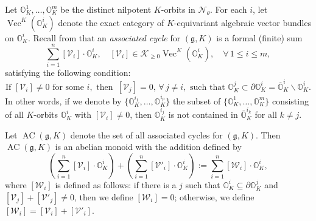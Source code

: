 \documentclass[11pt, a4paper]{amsart}
\newcommand{\g}{\mathfrak{g}}
\newcommand{\orb}{\mathbb{O}}
\newcommand{\orbk}{\orb_{K}}
\newcommand{\cK}{\mathcal{K}}
\newcommand{\cN}{\mathcal{N}}
\newcommand{\cV}{\mathcal{V}}
\newcommand{\cW}{\mathcal{W}}
\DeclareMathOperator{\AC}{AC}
\DeclareMathOperator{\Vect}{Vec}
\theoremstyle{definition}
\numberwithin{equation}{section}
\begin{document}
Let $\orbk^1, \ldots, \orbk^m$ be the distinct nilpotent $K$-orbits in $\cN_\theta$. For each $i$, let $\Vect^K(\orbk^i)$ denote the exact category of $K$-equivariant algebraic vector bundles on $\orbk^i$. Recall from \cite[\S\,5.2]{DMB-Hodge} that an \emph{associated cycle} for $(\g,K)$ is a formal (finite) sum 
	\[\sum_{i=1}^n [\cV_i] \cdot \orbk^i, \quad [\cV_i] \in \cK_{\geqslant 0}\Vect^K(\orbk^i), \quad \forall\, 1 \leqslant i \leqslant m, \] 
satisfying the following condition: 
	\[\text{If } [\cV_i] \neq 0 \text{ for some } i, \text{ then } \,[\cV_j] = 0, \,\forall\, j \neq i, \text{ such that } \orbk^j \subset \partial \orbk^i = \overline{\orb}_{K}^i \backslash \orbk^i. \]
In other words, if we denote by $\{\orbk^{i_1}, \ldots, \orbk^{i_p}\}$ the subset of $\{ \orbk^1, \ldots ,\orbk^m\}$ consisting of all $K$-orbits $\orbk^i$ with $[\cV_i] \neq 0$, then $\orbk^{i_j}$ is not contained in $\overline{\orb}_{K}^{i_k}$ for all $k \neq j$.

Let $\AC(\g,K)$ denote the set of all associated cycles for $(\g,K)$. Then $\AC(\g,K)$ is an abelian monoid with the addition defined by
\[
	\left(\sum_{i=1}^n [\cV_i] \cdot \orbk^i \right) + \left(\sum_{i=1}^n [\cV'_i] \cdot \orbk^i \right) := \sum_{i=1}^n [\cW_i] \cdot \orbk^i,\]
where $[\cW_i]$ is defined as follows: if there is a $j$ such that $\orbk^i \subseteq \partial \orbk^j$ and $[\cV_j] + [\cV'_j] \neq 0$, then we define $[\cW_i]=0$; otherwise, we define $[\cW_i] = [\cV_i] + [\cV'_i]$.
\end{document}
